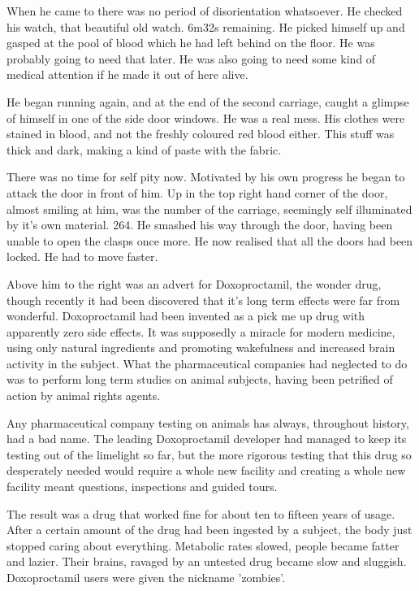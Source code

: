 \thoughtbreak



When he came to there was no period of disorientation whatsoever.  He checked his watch, that beautiful old watch.  6m32s remaining.  He picked himself up and gasped at the pool of blood which he had left behind on the floor.  He was probably going to need that later.  He was also going to need some kind of medical attention if he made it out of here alive.

He began running again, and at the end of the second carriage, caught a glimpse of himself in one of the side door windows.  He was a real mess.  His clothes were stained in blood, and not the freshly coloured red blood either.  This stuff was thick and dark, making a kind of paste with the fabric.  

There was no time for self pity now.  Motivated by his own progress he began to attack the door in front of him.  Up in the top right hand corner of the door, almost smiling at him, was the number of the carriage, seemingly self illuminated by it's own material.  264.  He smashed his way through the door, having been unable to open the clasps once more.  He now realised that all the doors had been locked.  He had to move faster.

Above him to the right was an advert for Doxoproctamil, the wonder drug, though recently it had been discovered that it's long term effects were far from wonderful.  Doxoproctamil had been invented as a pick me up drug with apparently zero side effects.  It was supposedly a miracle for modern medicine, using only natural ingredients and promoting wakefulness and increased brain activity in the subject.  What the pharmaceutical companies had neglected to do was to perform long term studies on animal subjects, having been petrified of action by animal rights agents.  

Any pharmaceutical company testing on animals has always, throughout history, had a bad name.  The leading Doxoproctamil developer had managed to keep its testing out of the limelight so far, but the more rigorous testing that this drug so desperately needed would require a whole new facility and creating a whole new facility meant questions, inspections and guided tours.  

The result was a drug that worked fine for about ten to fifteen years of usage.  After a certain amount of the drug had been ingested by a subject, the body just stopped caring about everything.  Metabolic rates slowed, people became fatter and lazier.  Their brains, ravaged by an untested drug became slow and sluggish.  Doxoproctamil users were given the nickname 'zombies'.  

